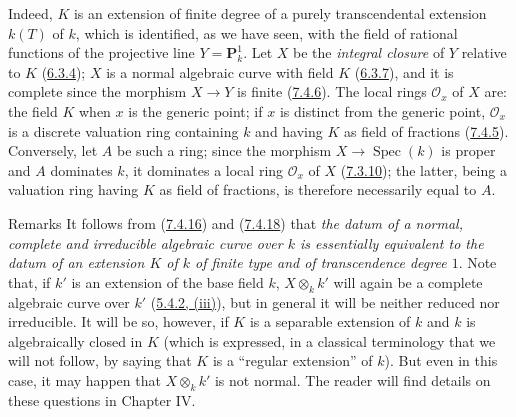 Indeed, $K$ is an extension of finite degree of a purely transcendental
extension $k(T)$ of $k$, which is identified, as we have seen, with the field
of rational functions of the projective line $Y=\mathbf{P}_k^1$. Let $X$ be the
\emph{integral closure} of $Y$ relative to $K$
(\hyperref[II.6.3.4]{6.3.4}); $X$ is a normal algebraic curve with
field $K$ (\hyperref[II.6.3.7]{6.3.7}), and it is complete since the
morphism $X\to Y$ is finite (\hyperref[II.7.4.6]{7.4.6}). The local
rings $\mathcal{O}_x$ of $X$ are: the field $K$ when $x$ is the generic
point; if $x$ is distinct from the generic point, $\mathcal{O}_x$ is a
discrete valuation ring containing $k$ and having $K$ as field of
fractions (\hyperref[II.7.4.5]{7.4.5}). Conversely, let $A$ be such a
ring; since the morphism $X\to\operatorname{Spec}(k)$ is proper and
$A$ dominates $k$, it dominates a local ring $\mathcal{O}_x$ of $X$
(\hyperref[II.7.3.10]{7.3.10}); the latter, being a valuation ring
having $K$ as field of fractions, is therefore necessarily equal to $A$.

\begin{namedtheorem}[7.4.19]{Remarks}
\label{II.7.4.19}
It follows from (\hyperref[II.7.4.16]{7.4.16}) and
(\hyperref[II.7.4.18]{7.4.18}) that \emph{the datum of a normal, complete
and irreducible algebraic curve over $k$ is essentially equivalent to
the datum of an extension $K$ of $k$ of finite type and of transcendence
degree $1$}. Note that, if $k'$ is an extension of the base field
$k$, $X\otimes_k k'$ will again be a complete algebraic curve over $k'$
(\hyperref[II.5.4.2]{5.4.2, (iii)}), but in general it will be neither
reduced nor irreducible. It will be so, however, if $K$ is a separable
extension of $k$ and $k$ is algebraically closed in $K$ (which is expressed,
in a classical terminology that we will not follow, by saying that $K$ is a
``regular extension'' of $k$). But even in this case, it may happen that
$X\otimes_k k'$ is not normal. The reader will find details on these
questions in Chapter IV.
\end{namedtheorem}

